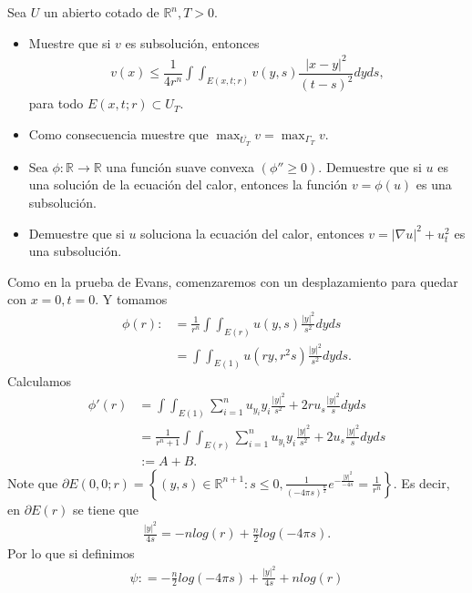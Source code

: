 \begin{homeworkProblem}
  Sea $U$ un abierto cotado de $\mathbb{R}^{n}, T>0.$
  \begin{itemize}
    \item Muestre que si $v$ es subsolución, entonces
    \begin{align*}
      v(x) \leq \dfrac{1}{4r^{n}} \int \int_{E(x,t;r)} v(y,s) \dfrac{|x-y|^{2}}{(t-s)^{2}}dyds,
    \end{align*}
    para todo $E(x,t;r) \subset U_{T}.$
    \item Como consecuencia muestre que $\max_{\overline{U_{T}}} v = \max_{\Gamma_{T}}v.$
    \item Sea $\phi : \mathbb{R} \rightarrow \mathbb{R}$ una función suave convexa $(\phi '' \geq 0).$ Demuestre que si $u$ es una solución de la ecuación del calor, entonces la función $v=\phi (u)$ es una subsolución.
    \item Demuestre que si $u$ soluciona la ecuación del calor, entonces $v = |\nabla u|^{2} + u_{t}^{2}$ es una subsolución.
  \end{itemize}
  \begin{solucion}
    Como en la prueba de Evans, comenzaremos con un desplazamiento para quedar con $x=0, t=0$. Y tomamos
    \begin{align*}
      \phi (r) :&= \frac{1}{r^{n}} \int \int_{E(r)} u(y,s) \frac{|y|^{2}}{s^{2}}dyds\\ 
                &= \int \int_{E(1)} u(ry,r^{2}s)\frac{|y|^{2}}{s^{2}}dyds.
    \end{align*}
    Calculamos
    \begin{align*}
      \phi'(r)&= \int \int_{E(1)} \sum_{i=1}^{n} u_{y_{i}}y_{i}\frac{|y|^{2}}{s^{2}} + 2ru_{s}\frac{|y|^{2}}{s} dyds\\ 
              &= \frac{1}{r^n+1} \int \int_{E(r)} \sum_{i=1}^{n} u_{y_{i}}y_{i}\frac{|y|^{2}}{s^{2}} + 2u_{s}\frac{|y|^{2}}{s} dyds\\
              &:= A+B. 
    \end{align*}
    Note que $\partial E(0,0;r) = \left\{ (y,s) \in \mathbb{R}^{n+1}: s \leq 0, \frac{1}{(-4\pi s)^{\frac{n}{2}}}e^{- \frac{|y|^{2}}{-4s}} = \frac{1}{r^{n}}\right\}$. Es decir, en $\partial E(r)$ se tiene que
    \begin{align*}
      \frac{|y|^{2}}{4s} = -nlog(r) + \frac{n}{2}log(-4\pi s).
    \end{align*}
    Por lo que si definimos
    \begin{align*}
      \psi : = -\frac{n}{2}log(-4\pi s) + \frac{|y|^{2}}{4s} + nlog(r)

\end{align*}
\end{solucion}
\end{homeworkProblem}
